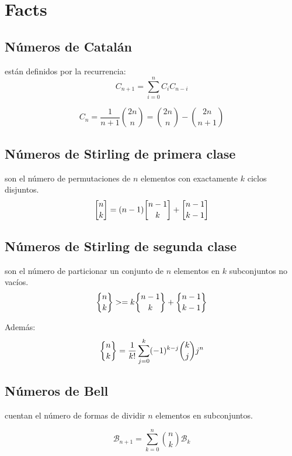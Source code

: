 
\section{Facts} 
\subsection{Números de Catal\'an} están definidos por la recurrencia:
\begin{equation*}
  C_{n+1} = \sum_{i=0}^nC_iC_{n-i}
\end{equation*}

\begin{equation*}
  C_n = \frac{1}{n+1}\binom{2n}{n} = \binom{2n}{n} - \binom{2n}{n+1}
\end{equation*}

\subsection{Números de Stirling de primera clase} son el número de permutaciones de $n$ elementos con exactamente $k$ ciclos disjuntos.
\begin{equation*}
  \stirlingfirst{n}{k} = (n-1)\stirlingfirst{n-1}{k} + \stirlingfirst{n-1}{k-1}
\end{equation*}

\subsection{Números de Stirling de segunda clase} son el número de particionar un conjunto de
$n$ elementos en $k$ subconjuntos no vacíos.
\begin{equation*}
  \stirlingsecond{n}{k} >= k\stirlingsecond{n-1}{k} + \stirlingsecond{n-1}{k-1}
\end{equation*}

Además:
\begin{equation*}
  \stirlingsecond{n}{k} = \frac{1}{k!}\sum_{j=0}^k (-1)^{k-j} \binom{k}{j} j^n
\end{equation*}
\newpage
\subsection{Números de Bell} cuentan el número de formas de dividir $n$ elementos en subconjuntos.

\begin{equation*}
  \mathcal{B}_{n+1} = \sum_{k=0}^n \binom{n}{k} \mathcal{B}_k
\end{equation*}

